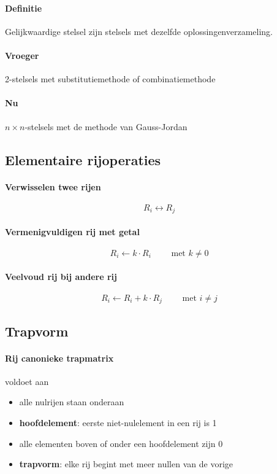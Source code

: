\documentclass[12pt,twoside]{article}
\begin{document}
\paragraph{Definitie}

Gelijkwaardige stelsel zijn stelsels met dezelfde oplossingenverzameling.

\paragraph{Vroeger}

2-stelsels met substitutiemethode of combinatiemethode

\paragraph{Nu}
$n \times n$-stelsels met de methode van Gauss-Jordan

\subsection{Elementaire rijoperaties}

\paragraph{Verwisselen twee rijen}

$$R_i \leftrightarrow R_j$$

\paragraph{Vermenigvuldigen rij met getal}

$$R_i \leftarrow k \cdot R_i \qquad \text{ met } k \neq 0$$

\paragraph{Veelvoud rij bij andere rij}

$$R_i \leftarrow R_i + k \cdot R_j \qquad \text{ met } i \neq j$$

\subsection{Trapvorm}

\paragraph{Rij canonieke trapmatrix} voldoet aan
\begin{itemize}
\item alle nulrijen staan onderaan
\item \textbf{hoofdelement}: eerste niet-nulelement in een rij is 1
\item alle elementen boven of onder een hoofdelement zijn 0
\item \textbf{trapvorm}: elke rij begint met meer nullen van de vorige
\end{itemize}
\end{document}
